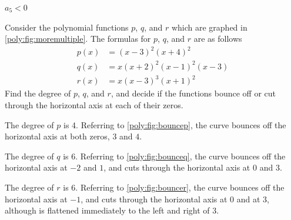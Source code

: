 \begin{doyouunderstand}
\begin{problem}
\begin{shortsolution}
			 $a_5<0$

		 \end{shortsolution}
		 \end{problem}
	 \end{doyouunderstand}


	 \begin{pccexample}
		 Consider the polynomial functions $p$, $q$, and $r$ which are
		 graphed in \cref{poly:fig:moremultiple}.
		 The formulas for $p$, $q$, and $r$ are as follows
		 \begin{align*}
			 p(x) & =(x-3)^2(x+4)^2       \\
			 q(x) & =x(x+2)^2(x-1)^2(x-3) \\
			 r(x) & =x(x-3)^3(x+1)^2
		 \end{align*}
		 Find the degree of $p$, $q$, and $r$, and decide if the functions bounce off or cut
		 through the horizontal axis at each of their zeros.
		 \begin{pccsolution}
			 The degree of $p$ is 4. Referring to \cref{poly:fig:bouncep},
			 the curve bounces off the horizontal axis at both zeros, $3$ and $4$.

			 The degree of $q$ is 6. Referring to \cref{poly:fig:bounceq},
			 the curve bounces off the horizontal axis at $-2$ and $1$, and cuts
			 through the horizontal axis at $0$ and $3$.

			 The degree of $r$ is 6. Referring to \cref{poly:fig:bouncer},
			 the curve bounces off the horizontal axis at $-1$, and cuts through
			 the horizontal axis at $0$ and at $3$, although is flattened immediately to the left and right of $3$.
		 \end{pccsolution}
	 \end{pccexample}

